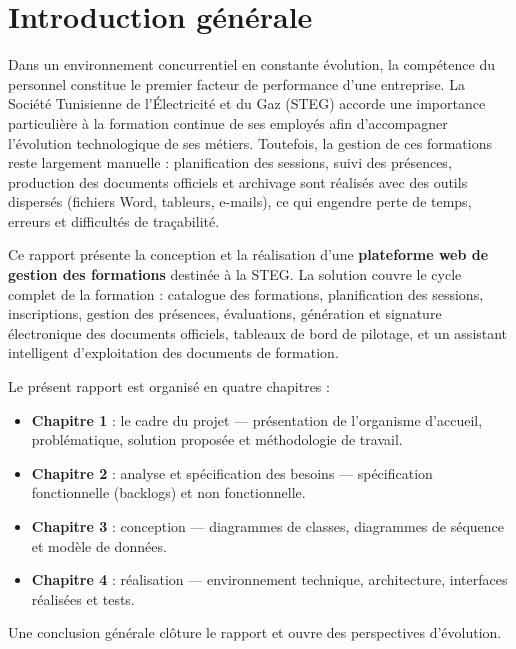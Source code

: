 \documentclass[12pt,a4paper]{report}
\begin{document}
\chapter*{Introduction générale}

Dans un environnement concurrentiel en constante évolution, la compétence
du personnel constitue le premier facteur de performance d'une entreprise.
La Société Tunisienne de l'Électricité et du Gaz (STEG) accorde une importance
particulière à la formation continue de ses employés afin d'accompagner
l'évolution technologique de ses métiers. Toutefois, la gestion de ces
formations reste largement manuelle : planification des sessions, suivi des
présences, production des documents officiels et archivage sont réalisés
avec des outils dispersés (fichiers Word, tableurs, e-mails), ce qui engendre
perte de temps, erreurs et difficultés de traçabilité.

Ce rapport présente la conception et la réalisation d'une \textbf{plateforme
web de gestion des formations} destinée à la STEG. La solution couvre le cycle
complet de la formation : catalogue des formations, planification des sessions,
inscriptions, gestion des présences, évaluations, génération et signature
électronique des documents officiels, tableaux de bord de pilotage, et un
assistant intelligent d'exploitation des documents de formation.

Le présent rapport est organisé en quatre chapitres :
\begin{itemize}
  \item \textbf{Chapitre 1} : le cadre du projet — présentation de
    l'organisme d'accueil, problématique, solution proposée et méthodologie de travail.
  \item \textbf{Chapitre 2} : analyse et spécification des besoins —
    spécification fonctionnelle (backlogs) et non fonctionnelle.
  \item \textbf{Chapitre 3} : conception — diagrammes de classes, diagrammes
    de séquence et modèle de données.
  \item \textbf{Chapitre 4} : réalisation — environnement technique,
    architecture, interfaces réalisées et tests.
\end{itemize}
Une conclusion générale clôture le rapport et ouvre des perspectives
d'évolution.

\end{document}
